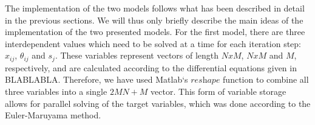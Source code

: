 The implementation of the two models follows what has been described in detail in the previous sections. We will thus only briefly describe the main ideas of the implementation of the two presented models.
For the first model, there are three interdependent values which need to be solved at a time for each iteration step: $x_{ij}$, $\theta_{ij}$ and $s_{j}$. These variables represent vectors of length $NxM$, $NxM$ and $M$, respectively, and are calculated according to the differential equations given in BLABLABLA. Therefore, we have  used Matlab‘s $\textit{reshape}$ function to combine all three variables into a single $2MN+M$ vector. This form of variable storage allows for parallel solving of the target variables, which was done according to the Euler-Maruyama method.
